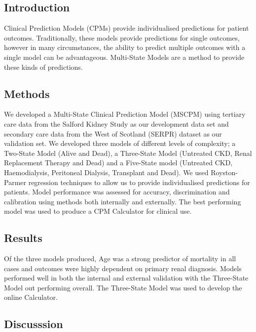 \documentclass[12pt,PhD,twoside,openright]{muthesis}
\begin{document}
\hypertarget{introduction-6}{%
\subsection*{Introduction}\label{introduction-6}}

Clinical Prediction Models (CPMs) provide individualised predictions for patient outcomes. Traditionally, these models provide predictions for single outcomes, however in many circumstances, the ability to predict multiple outcomes with a single model can be advantageous. Multi-State Models are a method to provide these kinds of predictions.

\hypertarget{methods-5}{%
\subsection*{Methods}\label{methods-5}}

We developed a Multi-State Clinical Prediction Model (MSCPM) using tertiary care data from the Salford Kidney Study as our development data set and secondary care data from the West of Scotland (SERPR) dataset as our validation set. We developed three models of different levels of complexity; a Two-State Model (Alive and Dead), a Three-State Model (Untreated CKD, Renal Replacement Therapy and Dead) and a Five-State model (Untreated CKD, Haemodialysis, Peritoneal Dialysis, Transplant and Dead). We used Royston-Parmer regression techniques to allow us to provide individualised predictions for patients. Model performance was assessed for accuracy, discrimination and calibration using methods both internally and externally. The best performing model was used to produce a CPM Calculator for clinical use.

\hypertarget{results-4}{%
\subsection*{Results}\label{results-4}}

Of the three models produced, Age was a strong predictor of mortality in all cases and outcomes were highly dependent on primary renal diagnosis. Models performed well in both the internal and external validation with the Three-State Model out performing overall. The Three-State Model was used to develop the online Calculator.

\hypertarget{discusssion}{%
\subsection*{Discusssion}\label{discusssion}}
\end{document}
